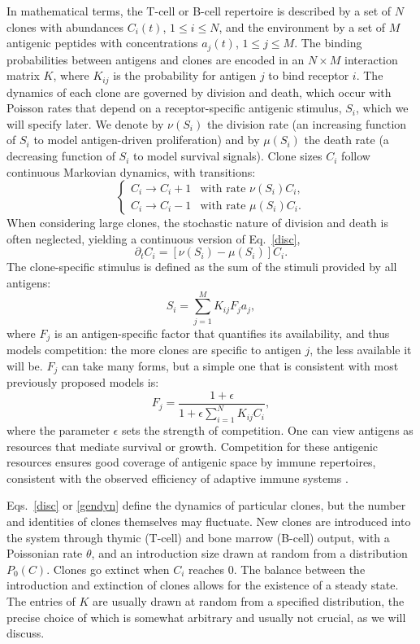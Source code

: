\documentclass[aps,pre,twocolumn,superscriptaddress,groupedaddress]{revtex4}
\newcommand{\beq}{\begin{equation}}
\newcommand{\eeq}{\end{equation}}
\newcommand{\<}{\langle}
\renewcommand{\>}{\rangle}
\begin{document}
In mathematical terms, the T-cell or B-cell repertoire is described by a set of $N$ clones with abundances $C_i(t)$, $1\leq i \leq N$, and the environment by a set of $M$ antigenic peptides with concentrations $a_j(t)$, $1\leq j \leq M$. The binding probabilities between antigens and clones are encoded in an $N\times M$ interaction matrix $K$, where $K_{ij}$ is the probability for antigen $j$ to bind receptor $i$.
The dynamics of each clone are governed by division and death, which occur with Poisson rates that depend on a receptor-specific antigenic stimulus, $S_i$, which we will specify later. We denote by $\nu(S_i)$ the division rate (an increasing function of $S_i$ to model antigen-driven proliferation) and by $\mu(S_i)$ the death rate (a decreasing function of $S_i$ to model survival signals). Clone sizes $C_i$ follow continuous Markovian dynamics, with transitions:
\beq
\left\{
    \begin{array}{ll}
       C_i\to C_i+1 & \textrm{with rate } \nu(S_i) C_i,\\
        C_i \to C_i-1  & \textrm{with rate } \mu(S_i) C_i.
    \end{array}
\right. 
\label{disc}
\eeq
When considering large clones, the stochastic nature of division and death is often neglected, yielding a continuous version of Eq.~\ref{disc},
\beq
 \partial_t C_i = [\nu(S_i) - \mu(S_i)] C_i.
 \label{gendyn}
\eeq
The clone-specific stimulus is defined as the sum of the stimuli provided by all antigens:
\beq\label{stim}
S_i= \sum_{j=1}^M K_{ij} F_ja_j ,
\eeq
where $F_j$ is an antigen-specific factor that quantifies its availability, and thus models competition: the more clones are specific to antigen $j$, the less available it will be.
$F_j$ can take many forms, but a simple one that is consistent with most previously proposed models is:
 \beq
 F_j = \frac{1+\epsilon}{1+\epsilon \sum_{i=1}^N K_{ij} C_i},
 \label{ava}
 \eeq
where the parameter $\epsilon$ sets the strength of competition.
 One can view antigens as resources that mediate survival or growth. Competition for these antigenic resources ensures good coverage of antigenic space by immune repertoires, consistent with the observed efficiency of adaptive immune systems \cite{Mayer2015}.

Eqs.~\ref{disc} or \ref{gendyn} define the dynamics of particular clones, but the number and identities of clones themselves may fluctuate. New clones are introduced into the system through thymic (T-cell) and bone marrow (B-cell) output, with a Poissonian rate $\theta$, and an introduction size drawn at random from a distribution $P_0(C)$. Clones
go extinct when $C_i$ reaches 0. The balance between the introduction and extinction of clones allows for the existence of a steady state. 
The entries of $K$ are usually drawn at random from a specified distribution, the precise choice of which is somewhat arbitrary and usually not crucial, as we will discuss.
 
\end{document}
